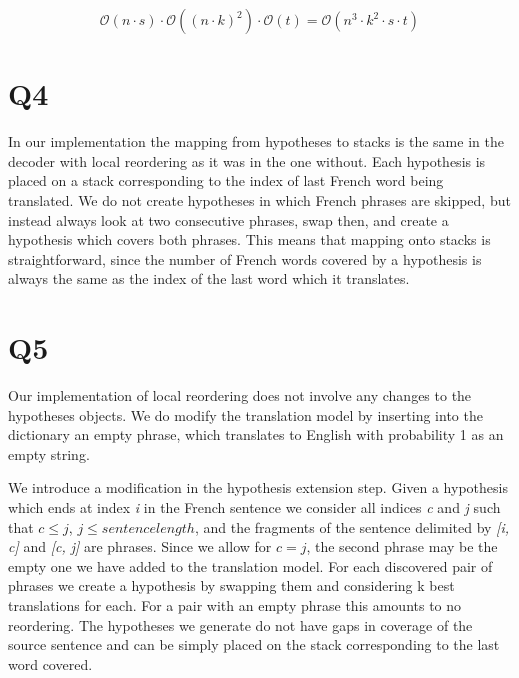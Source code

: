 \documentclass[11pt]{article}
\begin{document}
\[
\mathcal{O}(n \cdot s) \cdot \mathcal{O}({(n \cdot k)}^2)
\cdot \mathcal{O}(t)
= \mathcal{O}(n^3 \cdot k^2 \cdot s \cdot t)
\]

\section*{Q4}
In our implementation the mapping from hypotheses to stacks is the same in the decoder with local reordering as it was in the one without. Each hypothesis is placed on a stack corresponding to the index of last French word being translated. We do not create hypotheses in which French phrases are skipped, but instead always look at two consecutive phrases, swap then, and create a hypothesis which covers both phrases. This means that mapping onto stacks is straightforward, since the number of French words covered by a hypothesis is always the same as the index of the last word which it translates.

\section*{Q5}
Our implementation of local reordering does not involve any changes to the hypotheses objects. We do modify the translation model by inserting into the dictionary an empty phrase, which translates to English with probability 1 as an empty string.

We introduce a modification in the hypothesis extension step. Given a hypothesis which ends at index \textit{i} in the French sentence we consider all indices \textit{c} and \textit{j} such that $c \leq j$, $j \leq sentence length$, and the fragments of the sentence delimited by \textit{[i, c]} and \textit{[c, j]} are phrases. Since we allow for $c = j$, the second phrase may be the empty one we have added to the translation model. For each discovered pair of phrases we create a hypothesis by swapping them and considering k best translations for each. For a pair with an empty phrase this amounts to no reordering. The hypotheses we generate do not have gaps in coverage of the source sentence and can be simply placed on the stack corresponding to the last word covered.
\end{document}
